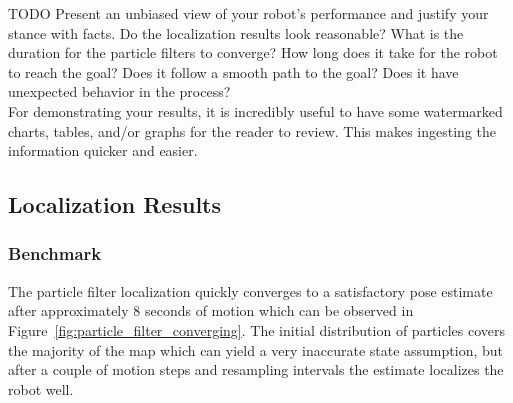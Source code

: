 \documentclass[10pt,journal,compsoc]{IEEEtran}
\begin{document}
TODO Present an unbiased view of your robot's performance and justify your stance with facts. Do the localization results look reasonable? What is the duration for the particle filters to converge? How long does it take for the robot to reach the goal? Does it follow a smooth path to the goal? Does it have unexpected behavior in the process? \\
For demonstrating your results, it is incredibly useful to have some watermarked charts, tables, and/or graphs for the reader to review. This makes ingesting the information quicker and easier.

\subsection{Localization Results}
\subsubsection{Benchmark}
The particle filter localization quickly converges to a satisfactory pose estimate after approximately 8 seconds of motion which can be observed in Figure~\ref{fig:particle_filter_converging}. The initial distribution of particles covers the majority of the map which can yield a very inaccurate state assumption, but after a couple of motion steps and resampling intervals the estimate localizes the robot well.
\end{document}
